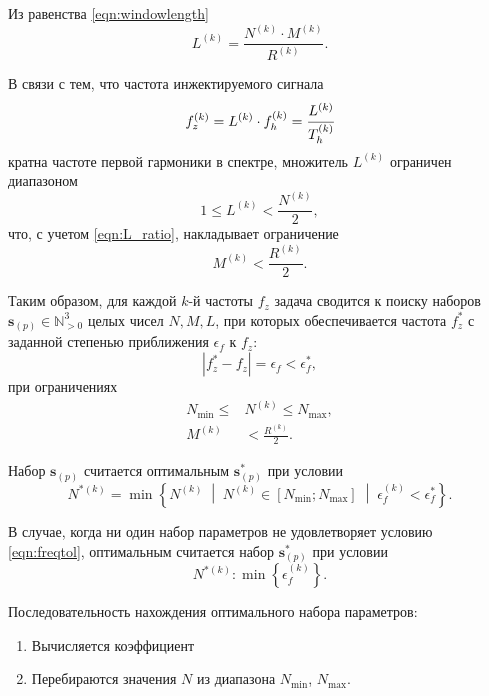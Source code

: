 Из равенства \eqref{eqn:windowlength}
\begin{equation}\label{eqn:L_ratio}
    L^{(k)} = \frac{N^{(k)} \cdot M^{(k)}}{R^{(k)}}.
\end{equation}

В связи с тем, что частота инжектируемого сигнала
\begin{equation*}
    f^{(k)}_{z} = L^{(k)} \cdot f^{(k)}_{h} = \cfrac{L^{(k)}}{T^{(k)}_{h}}
\end{equation*}
кратна частоте первой гармоники в спектре, множитель ${L^{(k)}}$ ограничен диапазоном
\begin{equation*}
    1 \leq L^{(k)} < \frac{N^{(k)}}{2},
\end{equation*}
что, с учетом \eqref{eqn:L_ratio}, накладывает ограничение
\begin{equation*}
    M^{(k)} < \frac{R^{(k)}}{2}.
\end{equation*}

Таким образом, для каждой $k$-й частоты ${f_{z}}$ задача сводится к поиску наборов ${\mathbf{s}_{(p)} \in \mathbb{N}_{> 0}^3}$ целых чисел $N, M, L$, при которых обеспечивается частота ${f^{*}_{z}}$ с заданной степенью приближения ${\epsilon_{f}}$ к ${f_{z}}$:
\begin{equation}\label{eqn:freqtol}
    \left| f^{*}_{z} - f_{z} \right| = \epsilon_{f} < \epsilon^{*}_{f},
\end{equation}
при ограничениях
\begin{equation*}
    \begin{aligned}
        N_\text{min} \leq &N^{(k)} \leq N_\text{max}, \\
        M^{(k)} & < \frac{R^{(k)}}{2}.
    \end{aligned}
\end{equation*}

Набор ${\mathbf{s}_{(p)}}$ считается оптимальным ${\mathbf{s}^{*}_{(p)}}$ при условии
\begin{equation*}
    N^{*(k)} = \min \left\{ N^{(k)} \;\middle|\; N^{(k)} \in \left[ N_\text{min}; N_\text{max} \right] \;\middle|\; \epsilon^{(k)}_{f} < \epsilon^{*}_{f} \right\}.
\end{equation*}

В случае, когда ни один набор параметров не удовлетворяет условию \eqref{eqn:freqtol}, оптимальным считается набор ${\mathbf{s}^{*}_{(p)}}$ при условии
\begin{equation*}
    N^{*(k)}: \min \left\{ \epsilon^{(k)}_{f} \right\}.
\end{equation*}

Последовательность нахождения оптимального набора параметров:
\begin{enumerate}
    \item Вычисляется коэффициент
    \item Перебираются значения $N$ из диапазона ${N_\text{min}}$, ${N_\text{max}}$.
\end{enumerate}